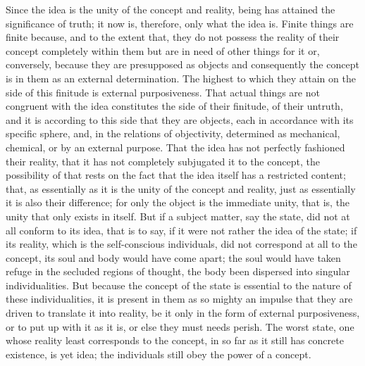 Since the idea is the unity of the concept and reality,
being has attained the significance of truth;
it now is, therefore, only what the idea is.
Finite things are finite because,
and to the extent that,
they do not possess the reality of
their concept completely within them
but are in need of other things for it
or, conversely, because they are presupposed as objects
and consequently the concept is in them as an external determination.
The highest to which they attain on
the side of this finitude is external purposiveness.
That actual things are not congruent with the idea
constitutes the side of their finitude, of their untruth,
and it is according to this side that they are objects,
each in accordance with its specific sphere,
and, in the relations of objectivity, determined
as mechanical, chemical, or by an external purpose.
That the idea has not perfectly fashioned their reality,
that it has not completely subjugated it to the concept,
the possibility of that rests on the fact that
the idea itself has a restricted content;
that, as essentially as it is
the unity of the concept and reality,
just as essentially it is also their difference;
for only the object is the immediate unity, that is,
the unity that only exists in itself.
But if a subject matter, say the state,
did not at all conform to its idea,
that is to say, if it were not rather the idea of the state;
if its reality, which is the self-conscious individuals,
did not correspond at all to the concept,
its soul and body would have come apart;
the soul would have taken refuge in the secluded regions of thought,
the body been dispersed into singular individualities.
But because the concept of the state is essential
to the nature of these individualities,
it is present in them as so mighty an impulse
that they are driven to translate it into reality,
be it only in the form of external purposiveness,
or to put up with it as it is,
or else they must needs perish.
The worst state, one whose reality least corresponds to the concept,
in so far as it still has concrete existence, is yet idea;
the individuals still obey the power of a concept.

